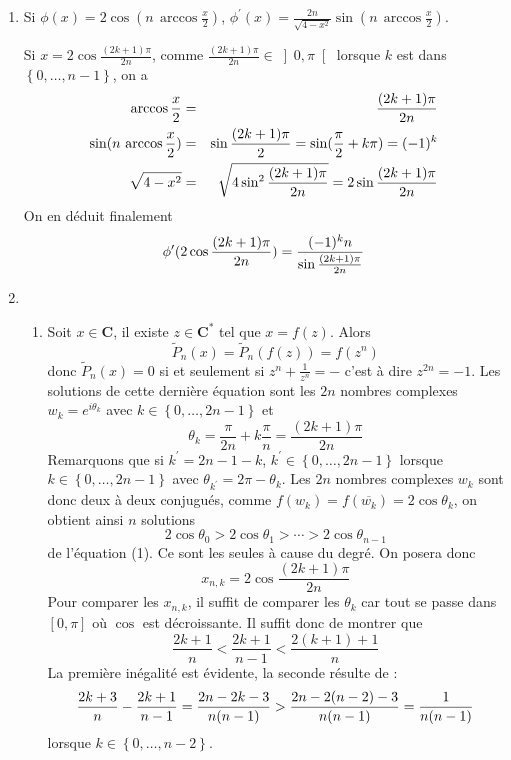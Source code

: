 \begin{enumerate}
\begin{enumerate}
\item  La formule pr{\'e}c{\'e}dente conduit {\`a} $P_{2}=X^{2}-2$, $$P_{3}=X^{3}-3X$$

\item  Il est clair par r{\'e}currence que $P_{n}$ est de degr{\'e} $n$ et que
$$\tilde{P}_{n}(-X)=(-1)^{n}P_{n}$$
Le polyn{\^o}me $P_{n}$ est donc pair lorsque $n$ est pair, impair lorsque $n$ est impair.
\end{enumerate}
\item  Si $\phi (x)=2\cos (n\,\arccos \frac{x}{2})$, $\phi ^{\prime }(x)=%
\frac{2n}{\sqrt{4-x^{2}}}\sin (n\,\arccos \frac{x}{2})$.

Si $x=2\cos \frac{(2k+1)\pi }{2n}$, comme $\frac{(2k+1)\pi }{2n}\in \left]0,\pi \right[ $ lorsque $k$ est dans $ \left\{ 0,\ldots ,n-1\right\} $, on a
\begin{eqnarray*}
\arccos \frac{x}{2} &=&\frac{(2k+1)\pi }{2n} \\
\sin (n\,\arccos \frac{x}{2}) &=&\sin \frac{(2k+1)\pi }{2}=\sin (\frac{\pi }{%
2}+k\pi )=(-1)^{k} \\
\sqrt{4-x^{2}} &=&\sqrt{4\sin ^{2}\frac{(2k+1)\pi }{2n}}=2\sin \frac{%
(2k+1)\pi }{2n}
\end{eqnarray*}
On en d{\'e}duit finalement
\[
\phi ^{\prime }(2\cos \frac{(2k+1)\pi }{2n})=\frac{(-1)^{k}n}{\sin \frac{%
(2k+1)\pi }{2n}}
\]

\item
\begin{enumerate}
\item  Soit $x\in \mathbf{C}$, il existe $z\in \mathbf{C}^{*}$ tel que $x=f(z)$. Alors
$$\tilde{P}_{n}(x)= \tilde{P}_{n}(f(z))=f(z^{n})$$
 donc
$\tilde{P}_{n}(x)=0$ si et seulement si $z^{n}+\frac{1}{z^{n}}=-$
c'est {\`a} dire $z^{2n}=-1$. Les solutions de cette derni{\`e}re {\'e}quation
sont les $2n$ nombres complexes $w_{k}=e^{i\theta _{k}}$ avec
$k\in \left\{ 0,\ldots ,2n-1\right\} $ et
$$\theta _{k}=\frac{\pi }{2n}+k\frac{\pi }{n}=\frac{(2k+1)\pi }{2n}$$
Remarquons que si $k^{\prime }=2n-1-k$, $k^{\prime }\in \left\{ 0,\ldots
,2n-1\right\} $ lorsque $k\in \left\{ 0,\ldots ,2n-1\right\} $ avec $\theta
_{k^{\prime }}=2\pi -\theta _{k}$. Les $2n$ nombres complexes $w_{k}$ sont
donc deux {\`a} deux conjugu{\'e}s, comme $f(w_{k})=f(\overline{w_{k}}%
)=2\cos \theta _{k}$, on obtient ainsi $n$ solutions
\[
2\cos \theta _{0}>2\cos \theta _{1}>\cdots >2\cos \theta _{n-1}
\]
de l'{\'e}quation (1). Ce sont les seules {\`a} cause du degr{\'e}. On
posera donc
\[
x_{n,k}=2\cos \frac{(2k+1)\pi }{2n}
\]
Pour comparer les $x_{n,k}$, il suffit de comparer les $\theta _{k}$ car
tout se passe dans $\left[ 0,\pi \right] $ o{\`u} $\cos $ est
d{\'e}croissante. Il suffit donc de montrer que
\[
\frac{2k+1}{n}<\frac{2k+1}{n-1}<\frac{2(k+1)+1}{n}
\]
La premi{\`e}re in{\'e}galit{\'e} est {\'e}vidente, la seconde r{\'e}sulte
de :
\[
\frac{2k+3}{n}-\frac{2k+1}{n-1}=\frac{2n-2k-3}{n(n-1)}>\frac{2n-2(n-2)-3}{%
n(n-1)}=\frac{1}{n(n-1)}
\]
lorsque $k\in \left\{ 0,\ldots ,n-2\right\} $.
\end{enumerate}


\end{enumerate}
